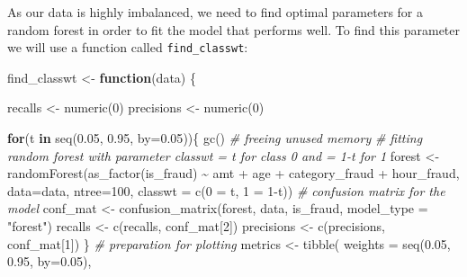 \documentclass[
]{report}
\newenvironment{Shaded}{\begin{snugshade}}{\end{snugshade}}
\newcommand{\AttributeTok}[1]{\textcolor[rgb]{0.77,0.63,0.00}{#1}}
\newcommand{\CommentTok}[1]{\textcolor[rgb]{0.56,0.35,0.01}{\textit{#1}}}
\newcommand{\ControlFlowTok}[1]{\textcolor[rgb]{0.13,0.29,0.53}{\textbf{#1}}}
\newcommand{\DecValTok}[1]{\textcolor[rgb]{0.00,0.00,0.81}{#1}}
\newcommand{\FloatTok}[1]{\textcolor[rgb]{0.00,0.00,0.81}{#1}}
\newcommand{\FunctionTok}[1]{\textcolor[rgb]{0.00,0.00,0.00}{#1}}
\newcommand{\NormalTok}[1]{#1}
\newcommand{\OtherTok}[1]{\textcolor[rgb]{0.56,0.35,0.01}{#1}}
\newcommand{\SpecialCharTok}[1]{\textcolor[rgb]{0.00,0.00,0.00}{#1}}
\newcommand{\StringTok}[1]{\textcolor[rgb]{0.31,0.60,0.02}{#1}}
\begin{document}
As our data is highly imbalanced, we need to find optimal parameters for
a random forest in order to fit the model that performs well. To find
this parameter we will use a function called \texttt{find\_classwt}:

\begin{Shaded}
\begin{Highlighting}[]
\NormalTok{find\_classwt }\OtherTok{\textless{}{-}} \ControlFlowTok{function}\NormalTok{(data) \{}
  
\NormalTok{  recalls }\OtherTok{\textless{}{-}} \FunctionTok{numeric}\NormalTok{(}\DecValTok{0}\NormalTok{)}
\NormalTok{  precisions }\OtherTok{\textless{}{-}} \FunctionTok{numeric}\NormalTok{(}\DecValTok{0}\NormalTok{)}
  
  \ControlFlowTok{for}\NormalTok{(t }\ControlFlowTok{in} \FunctionTok{seq}\NormalTok{(}\FloatTok{0.05}\NormalTok{, }\FloatTok{0.95}\NormalTok{, }\AttributeTok{by=}\FloatTok{0.05}\NormalTok{))\{}
    \FunctionTok{gc}\NormalTok{() }\CommentTok{\# freeing unused memory}
    \CommentTok{\# fitting random forest with parameter classwt = t for class \textquotesingle{}0\textquotesingle{} and = 1{-}t for \textquotesingle{}1\textquotesingle{}}
\NormalTok{    forest }\OtherTok{\textless{}{-}} \FunctionTok{randomForest}\NormalTok{(}\FunctionTok{as\_factor}\NormalTok{(is\_fraud) }\SpecialCharTok{\textasciitilde{}}\NormalTok{ amt }\SpecialCharTok{+}\NormalTok{ age }\SpecialCharTok{+}\NormalTok{ category\_fraud }\SpecialCharTok{+}\NormalTok{ hour\_fraud,}
                           \AttributeTok{data=}\NormalTok{data, }\AttributeTok{ntree=}\DecValTok{100}\NormalTok{, }\AttributeTok{classwt =} \FunctionTok{c}\NormalTok{(}\StringTok{\textquotesingle{}0\textquotesingle{}} \OtherTok{=}\NormalTok{ t, }\StringTok{\textquotesingle{}1\textquotesingle{}} \OtherTok{=} \DecValTok{1}\SpecialCharTok{{-}}\NormalTok{t))}
    \CommentTok{\# confusion matrix for the model}
\NormalTok{    conf\_mat }\OtherTok{\textless{}{-}} \FunctionTok{confusion\_matrix}\NormalTok{(forest, data, }\StringTok{\textquotesingle{}is\_fraud\textquotesingle{}}\NormalTok{, }\AttributeTok{model\_type =} \StringTok{"forest"}\NormalTok{)}
\NormalTok{    recalls }\OtherTok{\textless{}{-}} \FunctionTok{c}\NormalTok{(recalls, conf\_mat[}\DecValTok{2}\NormalTok{])}
\NormalTok{    precisions }\OtherTok{\textless{}{-}} \FunctionTok{c}\NormalTok{(precisions, conf\_mat[}\DecValTok{1}\NormalTok{])}
\NormalTok{  \}}
  \CommentTok{\# preparation for plotting}
\NormalTok{  metrics }\OtherTok{\textless{}{-}} \FunctionTok{tibble}\NormalTok{(}
    \AttributeTok{weights =} \FunctionTok{seq}\NormalTok{(}\FloatTok{0.05}\NormalTok{, }\FloatTok{0.95}\NormalTok{, }\AttributeTok{by=}\FloatTok{0.05}\NormalTok{),}

\end{Highlighting}
\end{Shaded}
\end{document}
